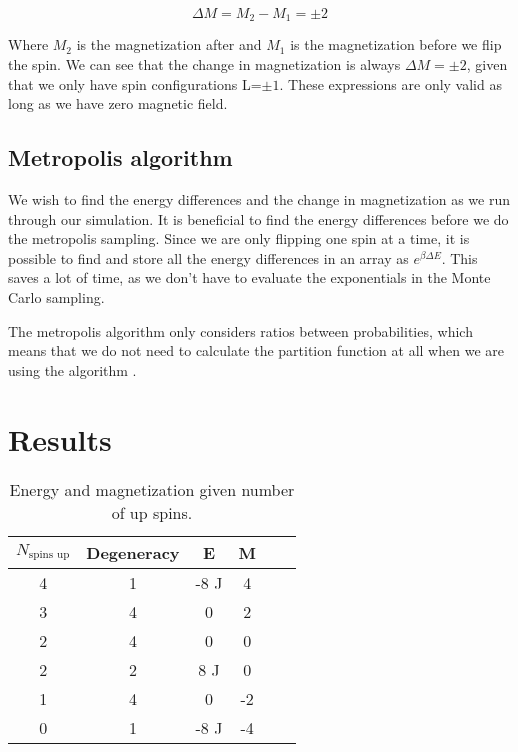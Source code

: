 \documentclass{article}
\begin{document}
\begin{multicols}{2}
\begin{equation}
\Delta M = M_2-M_1=\pm2
\label{eq:dM}
\end{equation}

Where $M_2$ is the magnetization after and $M_1$ is the magnetization before we flip the spin. We can see that the change in magnetization is always $\Delta M=\pm2$, given that we only have spin configurations L=$\pm1$. These expressions are only valid as long as we have zero magnetic field. 

\subsection*{Metropolis algorithm}

We wish to find the energy differences and the change in magnetization as we run through our simulation. It is beneficial to find the energy differences before we do the metropolis sampling. Since we are only flipping one spin at a time, it is possible to find and store all the energy differences in an array as $e^{\beta\Delta E}$. This saves a lot of time, as we don't have to evaluate the exponentials in the Monte Carlo sampling. 

The metropolis algorithm only considers ratios between probabilities, which means that we do not need to calculate the partition function at all when we are using the algorithm \cite{94}. 

\section{Results}

\begin{table}[H]
\begin{center}
\caption{Energy and magnetization given number of up spins.}
\begin{tabular}{  |c|c|c|c|c|c| } \hline
$N_{\text{spins up}}$&Degeneracy&E&M \\ \hline
4&1&-8 J&4\\ \hline
3&4&0 &2 \\ \hline
2&4&0&0\\ \hline
2&2&8 J&0\\ \hline
1&4&0&-2\\ \hline
0&1&-8 J&-4\\ \hline
\end{tabular}
\label{tab:up_spins}
\end{center}
\end{table}


\end{multicols}
\end{document}
